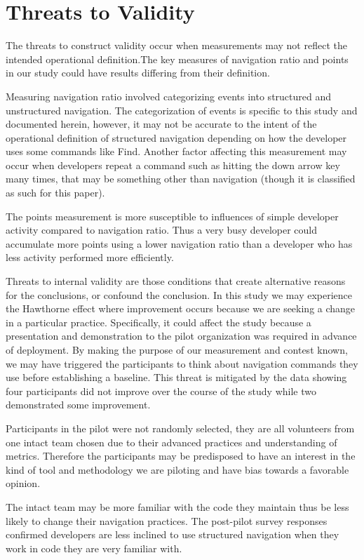 \documentclass{sig-alternate}
\begin{document}
\section{Threats to Validity}
The threats to construct validity occur when measurements may not reflect the intended operational definition.The key measures of navigation ratio and points in our study could have results differing from their definition.  

Measuring navigation ratio involved categorizing events into structured and unstructured navigation.  The categorization of events is specific to this study and documented herein, however, it may not be accurate to the intent of the operational definition of structured navigation depending on how the developer uses some commands like Find.  Another factor affecting this measurement may occur when developers repeat a command such as hitting the down arrow key many times, that may be something other than navigation (though it is classified as such for this paper).  

The points measurement is more susceptible to influences of simple developer activity compared to navigation ratio.  Thus a very busy developer could accumulate more points using a lower navigation ratio than a developer who has less activity performed more efficiently.  

Threats to internal validity are those conditions that create alternative reasons for the conclusions, or confound the conclusion.  
In this study we may experience the Hawthorne effect where improvement occurs because we are seeking a change in a particular practice.  Specifically, it could affect the study because a presentation and demonstration to the pilot organization was required in advance of deployment.  By making the purpose of our measurement and contest known,  we may have triggered the participants to think about navigation commands they use before establishing a baseline.   This threat is mitigated by the data showing four participants did not improve over the course of the study while two demonstrated some improvement.

Participants in the pilot were not randomly selected, they are all volunteers from one intact team chosen due to their advanced practices and understanding of metrics.  Therefore the participants may be predisposed to have an interest in the kind of tool and methodology we are piloting and have bias towards a favorable opinion.  

The intact team may be more familiar with the code they maintain thus be less likely to change their navigation practices.  The post-pilot survey responses confirmed developers are less inclined to use structured navigation when they work in code they are very familiar with.  
\end{document}
